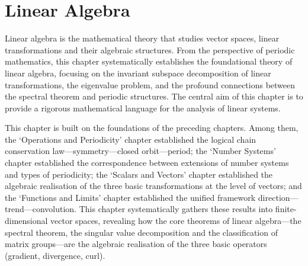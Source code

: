 \chapter{Linear Algebra}
\label{chap:linear_algebra}

\begin{remark}\label{rem:linear_algebra_chapter_positioning}
Linear algebra is the mathematical theory that studies vector spaces, linear transformations and their algebraic structures. From the perspective of periodic mathematics, this chapter systematically establishes the foundational theory of linear algebra, focusing on the invariant subspace decomposition of linear transformations, the eigenvalue problem, and the profound connections between the spectral theorem and periodic structures. The central aim of this chapter is to provide a rigorous mathematical language for the analysis of linear systems.

This chapter is built on the foundations of the preceding chapters. Among them, the `Operations and Periodicity' chapter established the logical chain conservation law---symmetry---closed orbit---period; the `Number Systems' chapter established the correspondence between extensions of number systems and types of periodicity; the `Scalars and Vectors' chapter established the algebraic realisation of the three basic transformations at the level of vectors; and the `Functions and Limits' chapter established the unified framework direction---trend---convolution. This chapter systematically gathers these results into finite-dimensional vector spaces, revealing how the core theorems of linear algebra---the spectral theorem, the singular value decomposition and the classification of matrix groups---are the algebraic realisation of the three basic operators (gradient, divergence, curl).


\end{remark}
